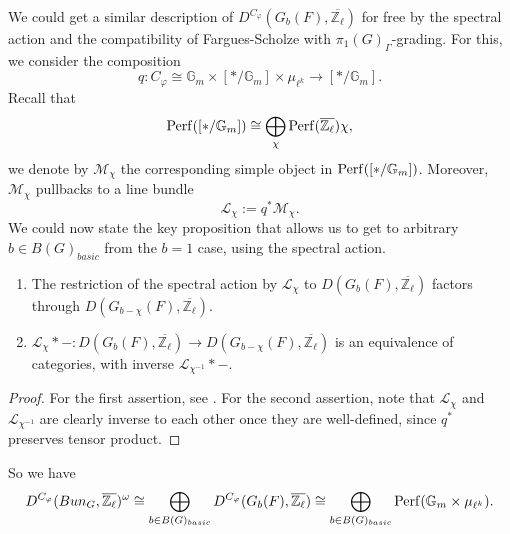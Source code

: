 We could get a similar description of $D^{C_{\varphi}}(G_b(F), \overline{\mathbb{Z}_{\ell}})$ for free by the spectral action and the compatibility of Fargues-Scholze with $\pi_1(G)_{\Gamma}$-grading. For this, we consider the composition
$$q: C_{\varphi} \cong \mathbb{G}_m \times [*/\mathbb{G}_m] \times \mu_{\ell^k} \to [*/\mathbb{G}_m].$$
Recall that 
$$\operatorname{\operatorname{Perf}}([*/\mathbb{G}_m]) \cong \bigoplus_{\chi}\operatorname{\operatorname{Perf}}(\overline{\mathbb{Z}_{\ell}})\chi,$$
we denote by $\mathcal{M}_{\chi}$ the corresponding simple object in $\operatorname{\operatorname{Perf}}([*/\mathbb{G}_m])$. Moreover, $\mathcal{M}_{\chi}$ pullbacks to a line bundle
$$\mathcal{L}_{\chi}:=q^*\mathcal{M}_{\chi}.$$
We could now state the key proposition that allows us to get to arbitrary $b \in B(G)_{basic}$ from the $b=1$ case, using the spectral action.
\begin{proposition}\label{Prop Spectral action}
	\begin{enumerate}
		\item The restriction of the spectral action by $\mathcal{L}_{\chi}$ to $D(G_b(F), \overline{\mathbb{Z}_{\ell}})$ factors through $D(G_{b-\chi}(F), \overline{\mathbb{Z}_{\ell}})$.
		
		\item $\mathcal{L}_{\chi}*-: D(G_b(F), \overline{\mathbb{Z}_{\ell}}) \to D(G_{b-\chi}(F), \overline{\mathbb{Z}_{\ell}})$ is an equivalence of categories, with inverse $\mathcal{L}_{\chi^{-1}}*-$.
	\end{enumerate}
\end{proposition}

\begin{proof}
	For the first assertion, see \cite[Lemma 5.3.2]{zou2022categorical}. For the second assertion, note that $\mathcal{L}_{\chi}$ and $\mathcal{L}_{\chi^{-1}}$ are clearly inverse to each other once they are well-defined, since $q^*$ preserves tensor product.
\end{proof}
So we have 
$$D^{C_{\varphi}}(Bun_G, \overline{\mathbb{Z}_{\ell}})^{\omega} \cong \bigoplus_{b \in B(G)_{basic}}D^{C_{\varphi}}(G_b(F), \overline{\mathbb{Z}_{\ell}}) \cong \bigoplus_{b \in B(G)_{basic}}\operatorname{\operatorname{Perf}}(\mathbb{G}_m \times \mu_{\ell^k}).$$

